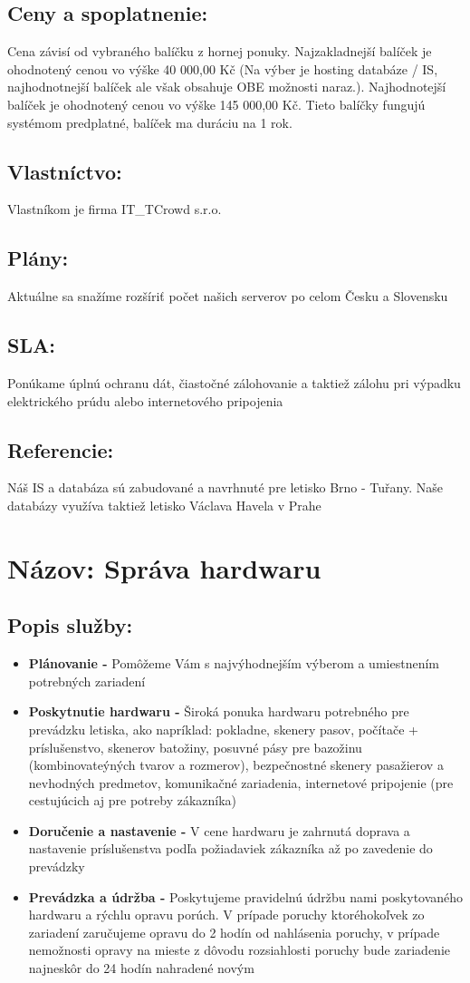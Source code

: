 \documentclass[a4paper, 11pt]{article}
\begin{document}
\subsection*{Ceny a spoplatnenie:}
Cena závisí od vybraného balíčku z hornej ponuky. Najzakladnejší balíček je ohodnotený cenou vo výške 40 000,00 Kč (Na výber je hosting databáze / IS, najhodnotnejší balíček ale však obsahuje OBE možnosti naraz.). Najhodnotejší balíček je ohodnotený cenou vo výške 145 000,00 Kč. Tieto balíčky fungujú systémom predplatné, balíček ma duráciu na 1 rok.
\subsection*{Vlastníctvo:}
Vlastníkom je firma IT\_TCrowd s.r.o.
\subsection*{Plány:}
Aktuálne sa snažíme rozšíriť počet našich serverov po celom Česku a Slovensku
\subsection*{SLA:}
Ponúkame úplnú ochranu dát, čiastočné zálohovanie a taktiež zálohu pri výpadku elektrického prúdu alebo internetového pripojenia
\subsection*{Referencie:}
Náš IS a databáza sú zabudované a navrhnuté pre letisko Brno - Tuřany. Naše databázy využíva taktiež letisko Václava Havela v Prahe

\section*{Názov: Správa hardwaru}
\subsection*{Popis služby:}
\begin{itemize}
\item \textbf{Plánovanie - } Pomôžeme Vám s najvýhodnejším výberom a umiestnením potrebných zariadení
\item \textbf{Poskytnutie hardwaru -} Široká ponuka hardwaru potrebného pre prevádzku letiska, ako napríklad: pokladne, skenery pasov, počítače + príslušenstvo, skenerov batožiny, posuvné pásy pre bazožinu (kombinovateýných tvarov a rozmerov), bezpečnostné skenery pasažierov a nevhodných predmetov, komunikačné zariadenia, internetové pripojenie (pre cestujúcich aj pre potreby zákazníka)
\item \textbf{Doručenie a nastavenie -} V cene hardwaru je zahrnutá doprava a nastavenie príslušenstva podľa požiadaviek zákazníka až po zavedenie do prevádzky
\item \textbf{Prevádzka a údržba -} Poskytujeme pravidelnú údržbu nami poskytovaného hardwaru a rýchlu opravu porúch. V prípade poruchy ktoréhokoľvek zo zariadení zaručujeme opravu do 2 hodín od nahlásenia poruchy, v prípade nemožnosti opravy na mieste z dôvodu rozsiahlosti poruchy bude zariadenie najneskôr do 24 hodín nahradené novým
\end{itemize}
\end{document}
